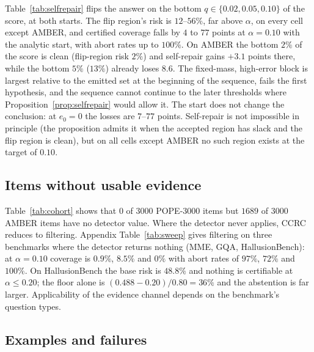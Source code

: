 Table~\ref{tab:selfrepair} flips the answer on the bottom $q\in\{0.02,0.05,0.10\}$ of the score, at both starts. The
flip region's risk is $12$--$56\%$, far above $\alpha$, on every cell except AMBER, and certified coverage falls by $4$ to $77$ points at
$\alpha=0.10$ with the analytic start, with abort rates up to $100\%$. On AMBER the bottom $2\%$ of the score is clean (flip-region risk $2\%$) and
self-repair gains $+3.1$ points there, while the bottom $5\%$ ($13\%$) already loses $8.6$. The fixed-mass, high-error block is largest relative
to the emitted set at the beginning of the sequence, fails the first hypothesis, and the sequence cannot continue to the
later thresholds where Proposition~\ref{prop:selfrepair} would allow it. The start does not change the
conclusion: at $e_0=0$ the losses are $7$--$77$ points. Self-repair is not impossible in principle (the
proposition admits it when the accepted region has slack and the flip region is clean), but on all cells except AMBER no such region exists at the target of $0.10$.

\begin{table}[t]
\centering
\caption{Self-certified repair against filtering at $\alpha=0.10$: gain in points (abort rate, \%) and the risk of the
flip region $r_{\text{flip}}$ (\%), at both starts; the last column is CCRC with the $q=0.10$ detector gate.}
\label{tab:selfrepair}
\scriptsize
\resizebox{\textwidth}{!}{}
\end{table}

\subsection{Items without usable evidence}
\label{sec:noevidence}

Table~\ref{tab:cohort} shows that $0$ of $3000$ POPE-3000 items but $1689$ of $3000$ AMBER items have no detector value.
Where the detector never applies, CCRC reduces to filtering. Appendix Table~\ref{tab:sweep} gives filtering on three
benchmarks where the detector returns nothing (MME, GQA, HallusionBench): at $\alpha=0.10$ coverage is $0.9\%$, $8.5\%$
and $0\%$ with abort rates of $97\%$, $72\%$ and $100\%$. On HallusionBench the base risk is $48.8\%$ and nothing is
certifiable at $\alpha\le0.20$; the floor alone is $(0.488-0.20)/0.80=36\%$ and the abstention is far larger.
Applicability of the evidence channel depends on the benchmark's question types.



\subsection{Examples and failures}
\label{sec:examples}


